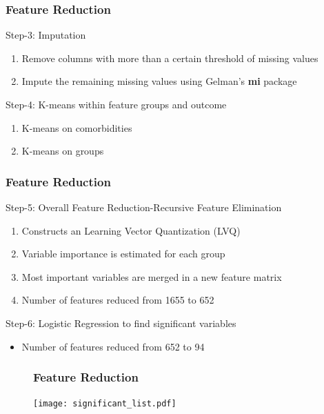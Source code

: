 \documentclass{beamer}
\begin{document}
\begin{frame}\frametitle{Feature Reduction}
	\begin{block}{Step-3: Imputation}
		\begin{enumerate}
			\item Remove columns with more than a certain threshold of missing values
			\item Impute the remaining missing values using Gelman's \textbf{mi} package
		\end{enumerate}\end{block}
	\begin{block}{Step-4: K-means within feature groups and outcome }
		\begin{enumerate}
			\item  K-means on comorbidities 
			\item  K-means on groups
		\end{enumerate}\end{block}
			\end{frame}	
			
\begin{frame}\frametitle{Feature Reduction}
	\begin{block}{Step-5: Overall Feature Reduction-Recursive Feature Elimination}
		\begin{enumerate}
			\item Constructs an Learning Vector Quantization (LVQ) 
			\item Variable importance is estimated for each group
			\item Most important variables are merged in a new feature matrix 
			\item  Number of features reduced from 1655 to 652 
		\end{enumerate}\end{block}\begin{block}{Step-6: Logistic Regression to find significant variables}
	\begin{itemize}
	\item Number of features reduced from 652 to 94
\end{itemize}\end{block}			
	\end{frame}	

\begin{frame}
	\begin{figure}[ht]\frametitle{Feature Reduction}
		\texttt{[image: significant\_list.pdf]}

	\end{figure}
\end{frame}	
\end{document}

